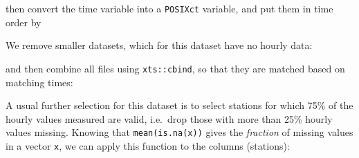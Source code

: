\documentclass[]{book}
\newenvironment{Shaded}{\begin{snugshade}}{\end{snugshade}}
\newcommand{\CommentTok}[1]{\textcolor[rgb]{0.56,0.35,0.01}{\textit{#1}}}
\newcommand{\ControlFlowTok}[1]{\textcolor[rgb]{0.13,0.29,0.53}{\textbf{#1}}}
\newcommand{\DataTypeTok}[1]{\textcolor[rgb]{0.13,0.29,0.53}{#1}}
\newcommand{\DecValTok}[1]{\textcolor[rgb]{0.00,0.00,0.81}{#1}}
\newcommand{\KeywordTok}[1]{\textcolor[rgb]{0.13,0.29,0.53}{\textbf{#1}}}
\newcommand{\NormalTok}[1]{#1}
\newcommand{\OperatorTok}[1]{\textcolor[rgb]{0.81,0.36,0.00}{\textbf{#1}}}
\newcommand{\StringTok}[1]{\textcolor[rgb]{0.31,0.60,0.02}{#1}}
\begin{document}
then convert the time variable into a \texttt{POSIXct} variable, and put them in time order by

\begin{Shaded}
\end{Shaded}

We remove smaller datasets, which for this dataset have no hourly data:

\begin{Shaded}
\end{Shaded}

and then combine all files using \texttt{xts::cbind}, so that they are matched based on matching times:

\begin{Shaded}
\end{Shaded}

A usual further selection for this dataset is to select stations
for which 75\% of the hourly values measured are valid, i.e.~drop
those with more than 25\% hourly values missing.
Knowing that \texttt{mean(is.na(x))} gives the \emph{fraction} of missing values
in a vector \texttt{x}, we can apply this function to the columns (stations):
\end{document}
